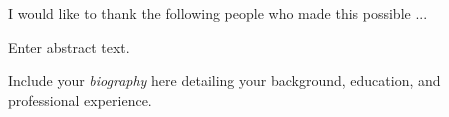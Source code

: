 \documentclass[11pt]{report}
\begin{document}
\acknowledgementspage

\noindent I would like to thank the following people who made this possible ...


\tableofcontents

\listoftables

\listoffigures

\abstractpage

Enter abstract text.

\startofchapters





% 






\biography

\noindent Include your \emph{biography} here detailing your background, education, and professional experience.
\end{document}

